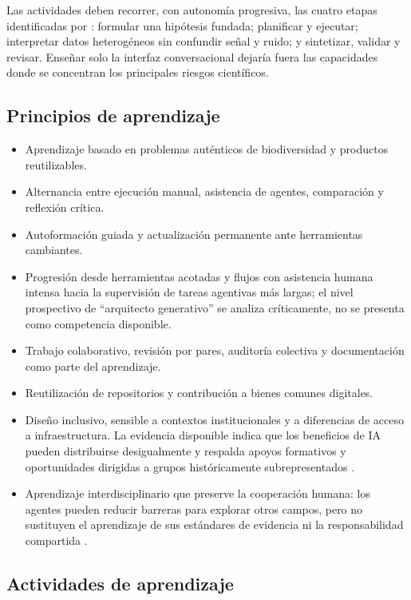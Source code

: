 \documentclass[11pt,a4paper]{article}
\begin{document}
Las actividades deben recorrer, con autonomía progresiva, las cuatro etapas
identificadas por \citet{wei2025agentic}: formular una hipótesis fundada; planificar
y ejecutar; interpretar datos heterogéneos sin confundir señal y ruido; y sintetizar,
validar y revisar. Enseñar solo la interfaz conversacional dejaría fuera las
capacidades donde se concentran los principales riesgos científicos.

\subsection{Principios de aprendizaje}

\begin{itemize}
  \item Aprendizaje basado en problemas auténticos de biodiversidad y productos
  reutilizables.
  \item Alternancia entre ejecución manual, asistencia de agentes, comparación y
  reflexión crítica.
  \item Autoformación guiada y actualización permanente ante herramientas
  cambiantes.
  \item Progresión desde herramientas acotadas y flujos con asistencia humana
  intensa hacia la supervisión de tareas agentivas más largas; el nivel
  prospectivo de ``arquitecto generativo'' se analiza críticamente, no se presenta
  como competencia disponible.
  \item Trabajo colaborativo, revisión por pares, auditoría colectiva y
  documentación como parte del aprendizaje.
  \item Reutilización de repositorios y contribución a bienes comunes digitales.
  \item Diseño inclusivo, sensible a contextos institucionales y a diferencias de
  acceso a infraestructura. La evidencia disponible indica que los beneficios de
  IA pueden distribuirse desigualmente y respalda apoyos formativos y oportunidades
  dirigidas a grupos históricamente subrepresentados
  \citep{gao2024quantifying}.
  \item Aprendizaje interdisciplinario que preserve la cooperación humana: los
  agentes pueden reducir barreras para explorar otros campos, pero no sustituyen el
  aprendizaje de sus estándares de evidencia ni la responsabilidad compartida
  \citep{zheng2026scientific}.
\end{itemize}

\subsection{Actividades de aprendizaje}
\end{document}
